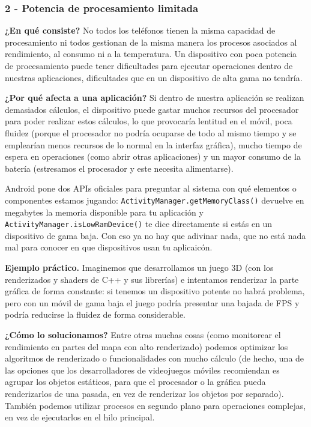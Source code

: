 \documentclass[11pt,a4paper]{article}
\newcommand{\code}[1]{\texttt{\color{primary}#1}}
\newcommand{\campo}[1]{\textbf{\color{primary}#1}}
\begin{document}
	\subsubsection*{2 - Potencia de procesamiento limitada}
	
	\campo{¿En qué consiste?}
	No todos los teléfonos tienen la misma capacidad de procesamiento ni todos gestionan de la misma manera los procesos asociados al rendimiento, al consumo ni a la temperatura. Un dispositivo con poca potencia de procesamiento puede tener dificultades para ejecutar operaciones dentro de nuestras aplicaciones, dificultades que en un dispositivo de alta gama no tendría.
	
	\campo{¿Por qué afecta a una aplicación?}
	Si dentro de nuestra aplicación se realizan demasiados cálculos, el dispositivo puede gastar muchos recursos del procesador para poder realizar estos cálculos, lo que provocaría lentitud en el móvil, poca fluidez (porque el procesador no podría ocuparse de todo al mismo tiempo y se emplearían menos recursos de lo normal en la interfaz gráfica), mucho tiempo de espera en operaciones (como abrir otras aplicaciones) y un mayor consumo de la batería (estresamos el procesador y este necesita alimentarse).
	
	Android pone dos APIs oficiales para preguntar al sistema con qué elementos o componentes estamos jugando:
	\code{ActivityManager.getMemoryClass()} devuelve en megabytes la memoria disponible para tu aplicación y \code{ActivityManager.isLowRamDevice()} te dice directamente si estás en un dispositivo de gama baja. Con eso ya no hay que adivinar nada, que no está nada mal para conocer en que dispositivos usan tu aplicaicón.
	
	\campo{Ejemplo práctico.}
	Imaginemos que desarrollamos un juego 3D (con los renderizados y shaders de C++ y sus librerías) e intentamos renderizar la parte gráfica de forma constante: si tenemos un dispositivo potente no habrá problema, pero con un móvil de gama baja el juego podría presentar una bajada de FPS y podría reducirse la fluidez de forma considerable.
	
	\campo{¿Cómo lo solucionamos?}
	Entre otras muchas cosas (como monitorear el rendimiento en partes del mapa con alto renderizado) podemos optimizar los algoritmos de renderizado o funcionalidades con mucho cálculo (de hecho, una de las opciones que los desarrolladores de videojuegos móviles recomiendan es agrupar los objetos estáticos, para que el procesador o la gráfica pueda renderizarlos de una pasada, en vez de renderizar los objetos por separado). También podemos utilizar procesos en segundo plano para operaciones complejas, en vez de ejecutarlos en el hilo principal.
	
\end{document}
